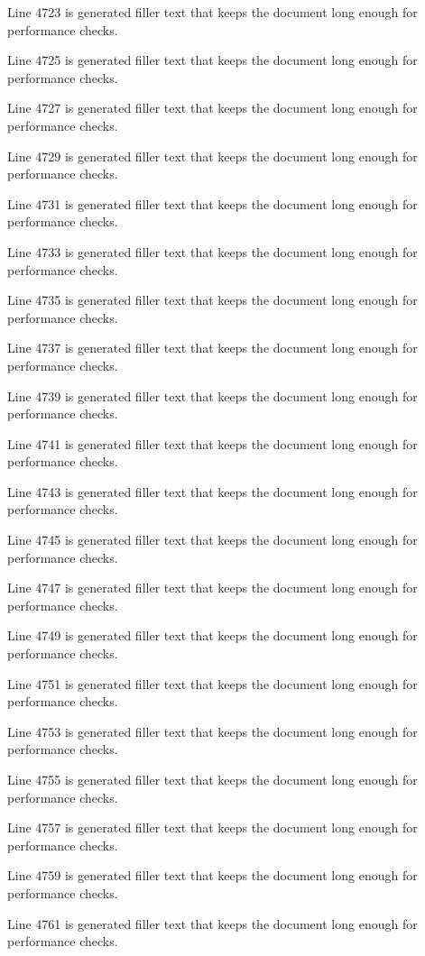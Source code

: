 Line 4723 is generated filler text that keeps the document long enough for performance checks.

Line 4725 is generated filler text that keeps the document long enough for performance checks.

Line 4727 is generated filler text that keeps the document long enough for performance checks.

Line 4729 is generated filler text that keeps the document long enough for performance checks.

Line 4731 is generated filler text that keeps the document long enough for performance checks.

Line 4733 is generated filler text that keeps the document long enough for performance checks.

Line 4735 is generated filler text that keeps the document long enough for performance checks.

Line 4737 is generated filler text that keeps the document long enough for performance checks.

Line 4739 is generated filler text that keeps the document long enough for performance checks.

Line 4741 is generated filler text that keeps the document long enough for performance checks.

Line 4743 is generated filler text that keeps the document long enough for performance checks.

Line 4745 is generated filler text that keeps the document long enough for performance checks.

Line 4747 is generated filler text that keeps the document long enough for performance checks.

Line 4749 is generated filler text that keeps the document long enough for performance checks.

Line 4751 is generated filler text that keeps the document long enough for performance checks.

Line 4753 is generated filler text that keeps the document long enough for performance checks.

Line 4755 is generated filler text that keeps the document long enough for performance checks.

Line 4757 is generated filler text that keeps the document long enough for performance checks.

Line 4759 is generated filler text that keeps the document long enough for performance checks.

Line 4761 is generated filler text that keeps the document long enough for performance checks.

